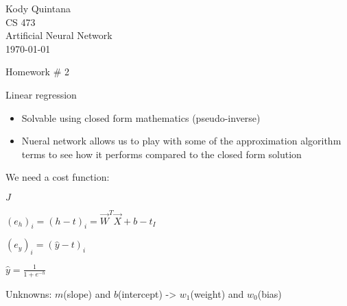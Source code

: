 \documentclass[14pt]{article}
\begin{document}
\begin{flushleft}
 
\large
Kody Quintana\\
CS 473\\
Artificial Neural Network\\
\today\\
\boldmath

\begin{center}
Homework \# 2
\end{center}

Linear regression

\begin{itemize}

\item Solvable using closed form mathematics (pseudo-inverse)
\item Nueral network allows us to play with some of the approximation algorithm terms to see how it performs compared to the closed form solution
\end{itemize}

We need a cost function:

$J$

$
(e_{h})_{i} = (h - t)_{i} = \vec{W}^T \vec{X} + b - t_{I}
$

$
(e_{y})_{i} = (\hat{y} - t)_{i}
$

$
\hat{y} = \frac
	{1}
	{1 + e^{-h}}
$


Unknowns: $m$(slope) and $b$(intercept) -> $w_1$(weight) and $w_0$(bias)




\end{flushleft}
\end{document}

